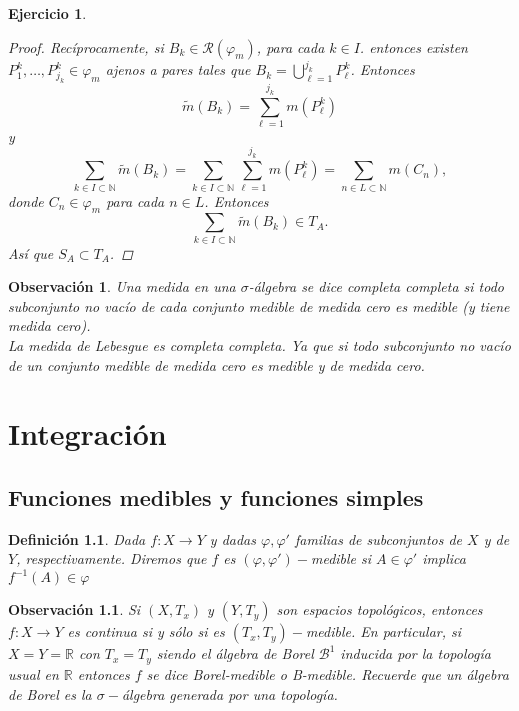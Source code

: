 \documentclass[twoside,12pt,a4 paper,openright]{book}
\newtheorem{ejer}[claim]{Ejercicio}
\newtheorem{defi}[claim]{Definici\'on}
\newtheorem{ob}[claim]{Observaci\'on}
\begin{document}
\begin{ejer}
\begin{enumerate}
\begin{proof}
   Rec\'iprocamente, si $ B_k\in  \mathcal{R}(\varphi_m)$,  para cada $ k\in I$.
   entonces existen $P_1^k, \dots, P_{j_k}^k \in \varphi_m$ ajenos a pares tales que  
    $\displaystyle B_k = \bigcup_{\ell =1}^{j_k}   P_{\ell}^k$. Entonces 
      $$\tilde{m}(B_k)  =  \sum_{\ell =1}^{j_k}  m( P_{\ell}^k)$$
       y 
     $$  \sum_{k\in I \subset \mathbb N} \tilde{m}(B_k) =  \sum_{k\in I \subset \mathbb N} \sum_{\ell =1}^{j_k}  m( P_{\ell}^k)  =  \sum_{n\in L \subset \mathbb N}   m( C_n) , $$
   donde $C_n\in \varphi_m$ para cada $n\in L$. Entonces 
   $$\sum_{k\in I \subset \mathbb N} \tilde{m}(B_k) \in T_A.$$ 
    As\'i que $S_A\subset T_A$.
  \end{proof}
  
  
   \end{enumerate}
\end{ejer}


\begin{ob}
Una medida   en una $\sigma$-\'algebra   se dice completa completa  si todo  subconjunto no vac\'io de cada conjunto  medible de medida cero es medible (y tiene  medida cero). 
\\
\noindent
La medida de Lebesgue    es completa  completa. Ya que   si todo subconjunto no vac\'io de un conjunto medible de medida cero es medible y de medida cero.  

\end{ob}


\chapter{Integraci\'on}

\section{Funciones medibles y funciones simples}

\begin{defi}
    Dada $f:X \to Y$ y dadas $\varphi,\varphi'$ familias de subconjuntos de $X$ y de $Y$, respectivamente. Diremos que $f$ es $(\varphi,\varphi')-$medible si $A\in \varphi'$ implica $f^{-1}(A)\in \varphi$
\end{defi}
\begin{ob}
    Si $(X,T_x)$ y $(Y, T_y)$ son espacios topol\'ogicos, entonces $f:X\to Y$ es continua si y s\'olo si es $(T_x,T_y)-$medible. En particular, si $X=Y=\mathbb{R}$ con $T_x= T_y$ siendo el \'algebra  de  Borel $\mathcal{B}^1$ inducida por la topolog\'ia usual en $\mathbb R$   entonces $f$ se dice Borel-medible o B-medible. Recuerde  que un \'algebra de Borel es la $\sigma-$\'algebra generada por una topolog\'ia.  
\end{ob}
\end{document}
